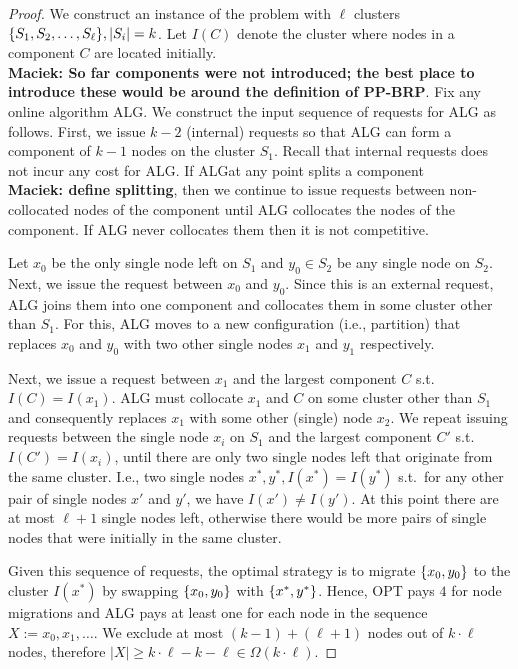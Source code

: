 \documentclass[manuscript,screen=true]{acmart}
\newcommand{\ALG}{ALG}
\newcommand{\PPOBRP}{PP-BRP}
\DeclarePairedDelimiter\set{\{}{\}}
\newcommand\maciek[1]{\color{brown}\textbf{\\ Maciek: #1}\color{black}}
\begin{document}
\begin{proof}
We construct an instance of the problem with $\ell$ clusters 
$\set{ S_1, S_2,\dots , S_{\ell}}, |S_i|  = k$.
Let $I(C)$ denote the cluster where nodes in a component $C$ are located initially.
\maciek{So far components were not introduced; the best place to introduce these would be around the definition of \PPOBRP}.
Fix any online algorithm \ALG.
We construct the input sequence of requests for \ALG{} as follows.
First,
we issue $k-2$ (internal) requests so that \ALG{} can form a component of $k-1$
nodes on the cluster $S_1$.
Recall that internal requests does not incur any cost for \ALG.
If \ALG{}at any point splits a component\maciek{define splitting}, then
we continue to issue requests between non-collocated nodes of the component until \ALG{} collocates the nodes of the component.
If \ALG{} never collocates them then it is not competitive.

Let $x_0$  be the only single node left on $S_1$ and  $y_0 \in S_2$ be any single node on $S_2$.
Next,
we issue the request between $x_0$ and $y_0$.
Since this is an external request,
ALG joins them into one component and collocates them in some cluster other than $S_1$.
For this,
ALG moves to a new configuration (i.e., partition)
that replaces $x_0$ and $y_0$ with two other single nodes $x_1$ and $y_1$ respectively.

Next,
we issue a request between $x_1$ and the largest component $C$ s.t.~$I(C) = I(x_1)$.
ALG must collocate $x_1$ and $C$ on some cluster other than $S_1$ and
consequently replaces $x_1$ with some other (single) node $x_2$.
We repeat issuing requests between the single node $x_i$ on $S_1$ and the largest component $C'$ s.t.~$I(C')=I(x_i)$,
 until there are only two single nodes left that  originate from the same cluster.
I.e.,
two single nodes $x^*, y^*,I(x^*) = I(y^*)$ s.t.~for any other pair of single nodes
$x'$ and $y'$,
we have $I(x') \neq I(y')$.
At this point there are at most $\ell+1$ single nodes left,
otherwise there would be more pairs of single nodes that were initially in the same cluster.

Given this sequence of requests,
the optimal strategy is to migrate $\set{x_0,y_0}$ to the cluster $I(x^*)$ by
 swapping $\set{x_0,y_0}$ with $\set{x^*,y^*}$.
Hence,
OPT pays $4$ for node migrations and
ALG pays at least one for each node in the sequence $X := x_0, x_1,\dots$.
We exclude at most $(k-1) + ( \ell+1)$ nodes out of $k \cdot \ell$ nodes,
therefore $|X| \geq k \cdot \ell - k - \ell \in \Omega(k\cdot\ell)$.
\end{proof}
\end{document}
